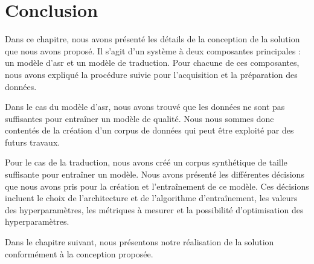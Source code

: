 \section{Conclusion}

Dans ce chapitre, nous avons présenté les détails de la conception de la solution que nous avons proposé.
Il s'agit d'un système à deux composantes principales : 
un modèle d'\gls{asr} et un modèle de traduction.
Pour chacune de ces composantes, nous avons expliqué la procédure suivie 
pour l'acquisition et la préparation des données.

Dans le cas du modèle d'\gls{asr}, nous avons trouvé que les données ne sont pas suffisantes 
pour entraîner un modèle de qualité.
Nous nous sommes donc contentés de la création d'un corpus de données qui peut être exploité par des futurs travaux.

Pour le cas de la traduction, nous avons créé un corpus synthétique de taille suffisante pour entraîner un modèle.
Nous avons présenté les différentes décisions que nous avons pris pour la création et l'entraînement de ce modèle.
Ces décisions incluent le choix de l'architecture et de l'algorithme d'entraînement, 
les valeurs des hyperparamètres, les métriques à mesurer et la possibilité d'optimisation des hyperparamètres.

Dans le chapitre suivant, nous présentons notre réalisation de la solution conformément à la conception proposée.


